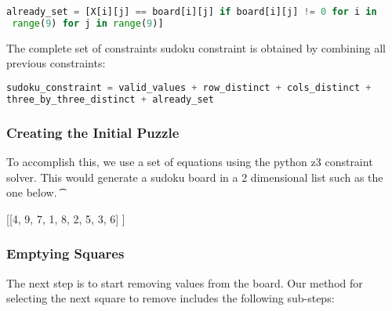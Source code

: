 \singlespace
\begin{lstlisting}[language=python, frame = single]
 already_set = [X[i][j] == board[i][j] if board[i][j] != 0 for i in
 range(9) for j in range(9)]

\end{lstlisting}
\doublespace

The complete set of constraints sudoku constraint is obtained by
combining all previous constraints:

\singlespace
\begin{lstlisting}[language=python, frame = single]
sudoku_constraint = valid_values + row_distinct + cols_distinct +
three_by_three_distinct + already_set
\end{lstlisting}
\doublespace


\subsubsection{Creating the Initial Puzzle}
To accomplish this, we use a set of equations using the python z3 constraint solver. This would generate a sudoku board in a 2 dimensional list such as the one
below. 
\t{
\singlespace
\begin{center}
[[4, 9, 7, 1, 8, 2, 5, 3, 6] \newline
[1, 5, 2, 3, 6, 4, 8, 9, 7] \newline
[8, 6, 3, 5, 7, 9, 4, 1, 2] \newline
[7, 3, 4, 6, 9, 1, 2, 5, 8] \newline
[2, 8, 9, 4, 3, 5, 7, 6, 1] \newline
[5, 1, 6, 7, 2, 8, 9, 4, 3] \newline
[3, 2, 5, 9, 1, 7, 6, 8, 4] \newline
[9, 7, 1, 8, 4, 6, 3, 2, 5] \newline
[6, 4, 8, 2, 5, 3, 1, 7, 9]] \newline
\end{center}}
\doublespace

\subsubsection{Emptying Squares}

The next step is to start removing values from the board. Our method for
selecting the next square to remove includes the following
sub-steps:

